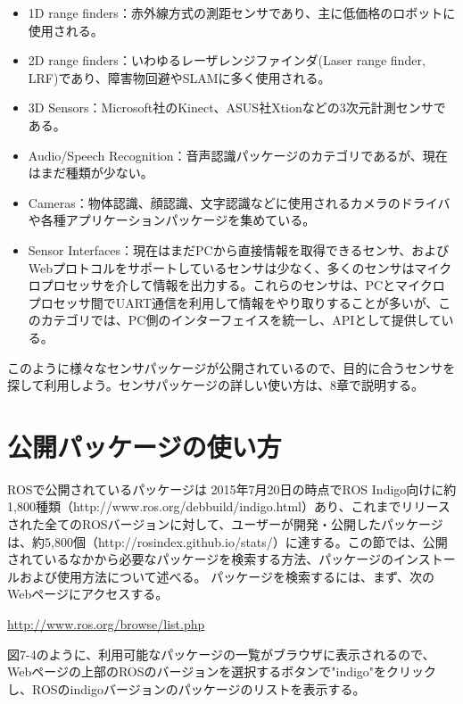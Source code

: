 \begin{itemize}
\item 1D range finders：赤外線方式の測距センサであり、主に低価格のロボットに使用される。
\item 2D range finders：いわゆるレーザレンジファインダ(Laser range finder, LRF)であり、障害物回避やSLAMに多く使用される。
\item 3D Sensors：Microsoft社のKinect、ASUS社Xtionなどの3次元計測センサである。
\item Audio/Speech Recognition：音声認識パッケージのカテゴリであるが、現在はまだ種類が少ない。
\item Cameras：物体認識、顔認識、文字認識などに使用されるカメラのドライバや各種アプリケーションパッケージを集めている。
\item Sensor Interfaces：現在はまだPCから直接情報を取得できるセンサ、およびWebプロトコルをサポートしているセンサは少なく、多くのセンサはマイクロプロセッサを介して情報を出力する。これらのセンサは、PCとマイクロプロセッサ間でUART通信を利用して情報をやり取りすることが多いが、このカテゴリでは、PC側のインターフェイスを統一し、APIとして提供している。
\end{itemize}

このように様々なセンサパッケージが公開されているので、目的に合うセンサを探して利用しよう。センサパッケージの詳しい使い方は、8章で説明する。

\section{公開パッケージの使い方}

ROSで公開されているパッケージは 2015年7月20日の時点でROS Indigo向けに約1,800種類（http://www.ros.org/debbuild/indigo.html）あり、これまでリリースされた全てのROSバージョンに対して、ユーザーが開発・公開したパッケージは、約5,800個（http://rosindex.github.io/stats/）に達する。この節では、公開されているなかから必要なパッケージを検索する方法、パッケージのインストールおよび使用方法について述べる。
パッケージを検索するには、まず、次のWebページにアクセスする。

\vspace{\baselineskip}
\url{http://www.ros.org/browse/list.php}
\vspace{\baselineskip}

図7-4のように、利用可能なパッケージの一覧がブラウザに表示されるので、Webページの上部のROSのバージョンを選択するボタンで"indigo"をクリックし、ROSのindigoバージョンのパッケージのリストを表示する。

